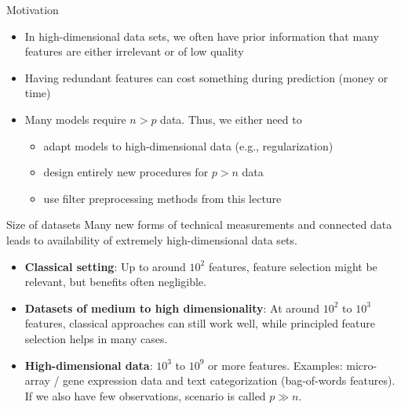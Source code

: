 \documentclass[11pt,compress,t,notes=noshow, xcolor=table]{beamer}
\begin{document}
\begin{vbframe}{Motivation}
\framebreak

\begin{itemize}
\setlength{\itemsep}{1.0em}
    \item In high-dimensional data sets, we often have prior information that many features are either irrelevant %
    or of low quality
    \item Having redundant features can cost something during prediction %
    (money or time)
    \item Many models require $n > p$ data. Thus, we either need to
    \begin{itemize}
    \item adapt models to high-dimensional data (e.g., regularization)
    \item design entirely new procedures for $p>n$ data
    \item use filter preprocessing methods from this lecture
    \end{itemize}
\end{itemize}
\end{vbframe}

\begin{vbframe}{Size of datasets}
Many new forms of technical measurements and connected data leads to availability of extremely high-dimensional data sets.

\vspace{0.5cm}
\begin{itemize}
\setlength{\itemsep}{1.2em}
    \item \textbf{Classical setting}: Up to around $10^2$ features, feature selection might be relevant, but benefits often negligible.
    \item \textbf{Datasets of medium to high dimensionality}:
    At around $10^2$ to $10^3$ features, classical approaches can still work well, while principled feature selection helps in many cases.
    \item \textbf{High-dimensional data}: $10^3$ to $10^9$ or more features.
    Examples: micro-array / gene expression data and text categorization (bag-of-words features).
    If we also have few observations, scenario is called $p \gg n$.
\end{itemize}

\end{vbframe}
\end{document}
